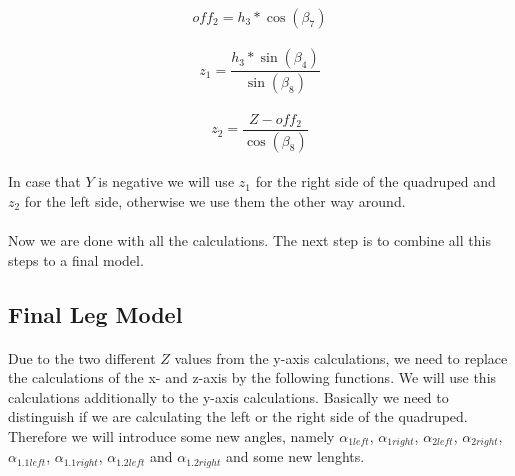 \documentclass{article}
\begin{document}
    \paragraph{}
    \begin{equation}
        off_2 = h_3 * \cos(\beta_7)
    \end{equation}

    \paragraph{}
    \begin{equation}
        z_1 = \frac{h_3 * \sin(\beta_4)}{\sin(\beta_8)}
    \end{equation}

    \paragraph{}
    \begin{equation}
        z_2 = \frac{Z - off_2}{\cos(\beta_8)}
    \end{equation}

    \paragraph{}
    In case that $Y$ is negative we will use $z_1$ for the right side of the quadruped and $z_2$ for the left side, otherwise we use them the other way around.

    \paragraph{}
    Now we are done with all the calculations. The next step is to combine all this steps to a final model. 
    


    \subsection{Final Leg Model}
    \paragraph{}
    Due to the two different $Z$ values from the y-axis calculations, we need to replace the calculations of the x- and z-axis by the following functions. We will use this calculations additionally to the y-axis calculations. Basically we need to distinguish if we are calculating the left or the right side of the quadruped. Therefore we will introduce some new angles, namely $\alpha_{1left}$, $\alpha_{1right}$, $\alpha_{2left}$, $\alpha_{2right}$, $\alpha_{1.1left}$, $\alpha_{1.1right}$, $\alpha_{1.2left}$ and $\alpha_{1.2right}$ and some new lenghts.
\end{document}
